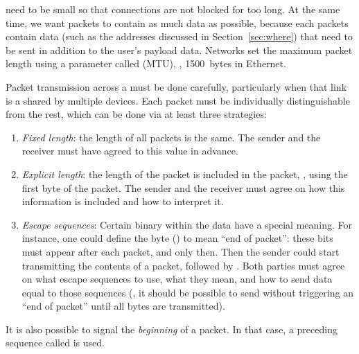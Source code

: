 need to be small so that connections are not blocked for too long. 
At the same time, we want packets to contain as much data as possible, because each packets 
contain  data (such as the addresses discussed in Section~\ref{sec:where}) that need
to be sent in addition to the user's payload data. Networks set the maximum packet length
using a parameter called  (MTU), \eg, 1500~bytes in Ethernet.


Packet transmission across a  must be done carefully,
particularly when that link is a  shared by multiple devices.
Each packet must be individually distinguishable from the rest, 
which can be done via at least three strategies:
\begin{enumerate}
\item \textit{Fixed length}: the length of all packets is the same. The sender and the receiver must have
agreed to this value in advance.

\item \textit{Explicit length}: the length of the packet is included in the packet, \eg, 
using the first byte of the packet. The sender and the receiver must agree on how this information
is included and how to interpret it.

\item \textit{Escape sequences}: Certain binary  
within the data have a special meaning. 
For instance, one could define the byte  () 
to mean ``end of packet'': these bits must appear after each packet, and only then.
% 
Then the sender could start transmitting the contents of a packet, followed by .
Both parties must agree on what escape sequences to use, what they mean, and how to 
send data equal to those sequences (\eg, it should be possible to send 
without triggering an ``end of packet'' until all bytes are transmitted).
\end{enumerate}

\begin{remark}
It is also possible to signal the \textit{beginning} of a packet. In that case, a preceding sequence called  is used.
\end{remark}


